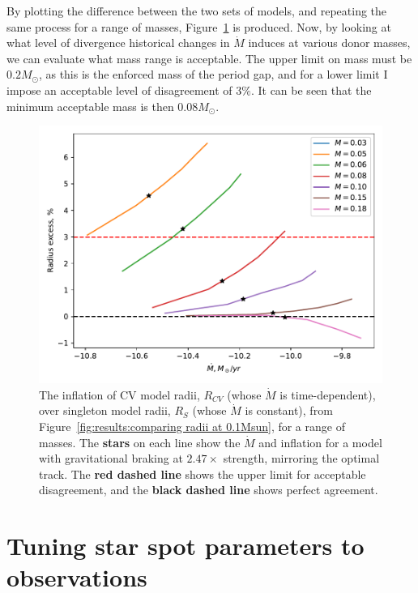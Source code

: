 By plotting the difference between the two sets of models, and repeating the same process for a range of masses, Figure~\ref{fig:results:comparing radii over a range of masses} is produced. Now, by looking at what level of divergence historical changes in $\dot M$ induces at various donor masses, we can evaluate what mass range is acceptable. The upper limit on mass must be $0.2 M_\odot$, as this is the enforced mass of the period gap, and for a lower limit I impose an acceptable level of disagreement of $3\%$. It can be seen that the minimum acceptable mass is then $0.08 M_\odot$.
\begin{figure}
    \centering
    \includegraphics[width=\textwidth]{figures/modelling/compare_multiple_mass_with_CV_K11_fig1a.pdf}
    \caption{The inflation of CV model radii, $R_{CV}$ (whose $\dot M$ is time-dependent), over singleton model radii, $R_S$ (whose $\dot M$ is constant), from Figure~\ref{fig:results:comparing radii at 0.1Msun}, for a range of masses. The {\bf stars} on each line show the $\dot M$ and inflation for a model with gravitational braking at $2.47\times$ strength, mirroring the \citet{knigge11} optimal track. The {\bf red dashed line} shows the upper limit for acceptable disagreement, and the {\bf black dashed line} shows perfect agreement.}
    \label{fig:results:comparing radii over a range of masses}
\end{figure}



\section{Tuning star spot parameters to observations}
\label{sect:modelling:tuning star spots to observations}

